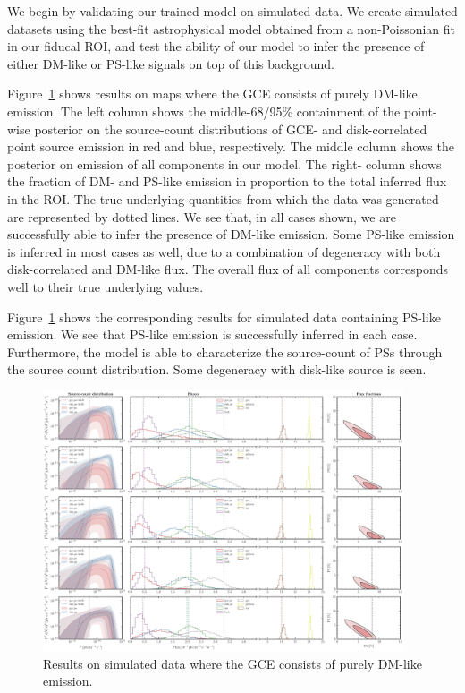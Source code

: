 \documentclass[prd,aps,10pt,nofootinbib,twocolumn,superscriptaddress,preprintnumbers,balancelastpage,longbibliography]{revtex4-1}
\begin{document}
We begin by validating our trained model on simulated data. We create simulated datasets using the best-fit astrophysical model obtained from a non-Poissonian fit in our fiducal ROI, and test the ability of our model to infer the presence of either DM-like or PS-like signals on top of this background.

Figure~\ref{fig:sim_sbi_dm} shows results on maps where the GCE consists of purely DM-like emission. The left column shows the middle-68/95\% containment of the point-wise posterior on the source-count distributions of GCE- and disk-correlated point source emission in red and blue, respectively. The middle column shows the posterior on emission of all components in our model. The right- column shows the fraction of DM- and PS-like emission in proportion to the total inferred flux in the ROI. The true underlying quantities from which the data was generated are represented by dotted lines. We see that, in all cases shown, we are successfully able to infer the presence of DM-like emission. Some PS-like emission is inferred in most cases as well, due to a combination of degeneracy with both disk-correlated and DM-like flux. The overall flux of all components corresponds well to their true underlying values.

Figure~\ref{fig:sim_sbi_dm} shows the corresponding results for simulated data containing PS-like emission. We see that PS-like emission is successfully inferred in each case. Furthermore, the model is able to characterize the source-count of PSs through the source count distribution. Some degeneracy with disk-like source is seen.

%
\begin{figure}
    \centering
    \includegraphics[width=0.95\textwidth]{plots/sim_sbi_dm.pdf}
    \caption{Results on simulated data where the GCE consists of purely DM-like emission.}
    \label{fig:sim_sbi_dm}
\end{figure}
%
\end{document}

